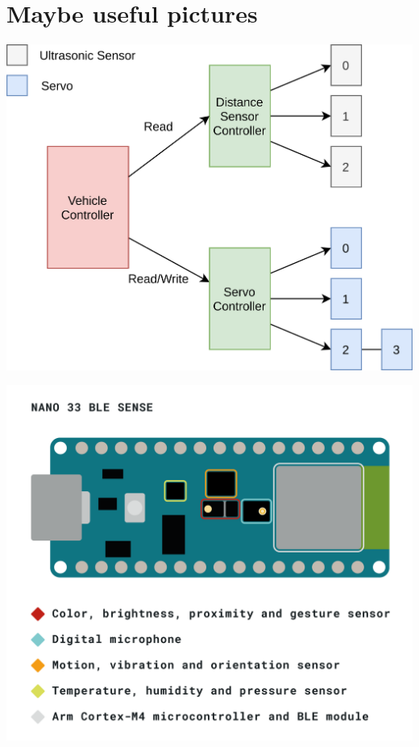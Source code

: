 \documentclass{article}
\begin{document}
\newpage
\section{Maybe useful pictures}

\includegraphics[width=\linewidth]{system-architecture.png}

\includegraphics[width=\linewidth]{img/NANO-33-BLE-Sense_sensor-indentification.png}
\end{document}
